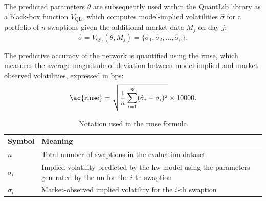 The predicted parameters $\theta$ are subsequently used within the QuantLib library as a black-box function $V_{\text{QL}}$, which computes model-implied volatilities $\hat{\sigma}$ for a portfolio of $n$ swaptions given the additional market data $M_j$ on day $j$:
\begin{equation}
	\hat{\sigma} = V_{\text{QL}}(\theta, M_j) = \{\hat{\sigma}_1, \hat{\sigma}_2, \dots, \hat{\sigma}_n\}.
\end{equation}

The predictive accuracy of the network is quantified using the \ac{rmse}, which measures the average magnitude of deviation between model-implied and market-observed volatilities, expressed in \ac{bps}:
\begin{equation}
	\text{\ac{rmse}} = \sqrt{\frac{1}{n}\sum_{i=1}^{n}(\hat{\sigma}_i - \sigma_i)^2} \times 10000.
\end{equation}

\begin{table}[H]
	\centering
	\caption{Notation used in the \ac{rmse} formula}
	\begin{tabular}{lp{12cm}}
		\toprule
		Symbol           & Meaning                                                                                                                 \\
		\midrule
		$n$              & Total number of swaptions in the evaluation dataset                                                                     \\
		$\hat{\sigma}_i$ & Implied volatility predicted by the \ac{hw} model using the parameters generated by the \ac{nn} for the $i$-th swaption \\
		$\sigma_i$       & Market-observed implied volatility for the $i$-th swaption                                                              \\
		\bottomrule
	\end{tabular}
\end{table}

